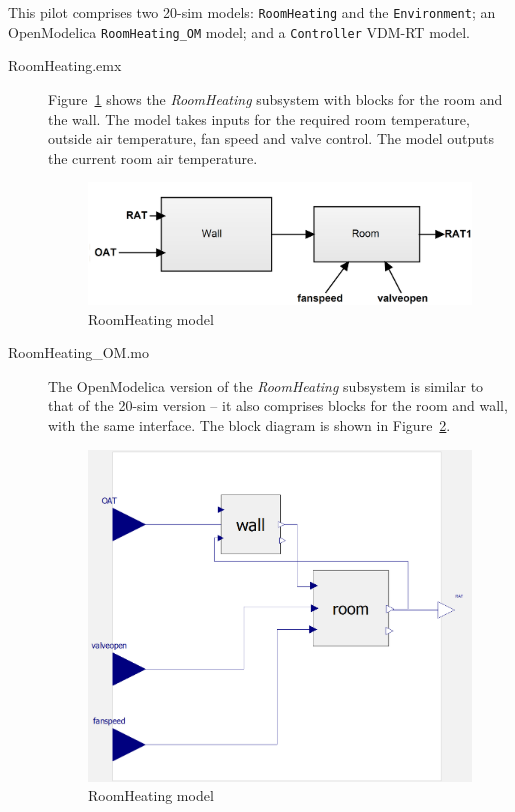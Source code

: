 This pilot 
comprises two 20-sim models: \texttt{RoomHeating} and the \texttt{Environment}; an OpenModelica \texttt{RoomHeating\_OM} model; and a \texttt{Controller} VDM-RT model. %

\begin{description}
  \item[RoomHeating.emx] Figure~\ref{fig:fcu_20-sim-RH_rg} shows the \emph{RoomHeating} subsystem with blocks for the room and the wall. The model takes inputs for the required room temperature, outside air temperature, fan speed and valve control. The model outputs the current room air temperature. 
 
\begin{figure}[htb!]
  \begin{center}
     \includegraphics[width=0.6\linewidth]{fcu/fcu_rh} 
     \caption{RoomHeating model}
      \label{fig:fcu_20-sim-RH_rg}
  \end{center}
\end{figure}

\item[RoomHeating\_OM.mo] The OpenModelica version of the \emph{RoomHeating} subsystem is similar to that of the 20-sim version -- it also comprises blocks for the room and wall, with the same interface. The block diagram is shown in Figure~\ref{fig:fcu_om-RH_rg}.
 
\begin{figure}[htb!]
  \begin{center}
     \includegraphics[width=0.6\linewidth]{fcu/fcu_rh_om} 
     \caption{RoomHeating model}
      \label{fig:fcu_om-RH_rg}
  \end{center}
\end{figure}



\end{description}
